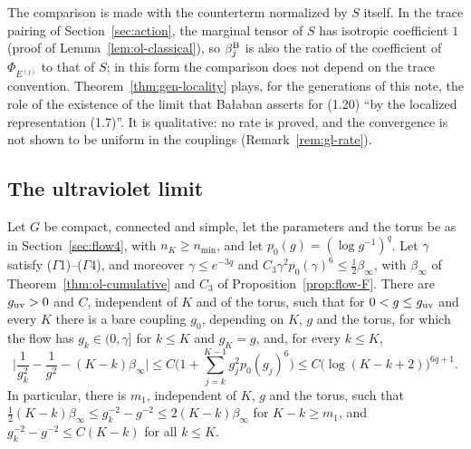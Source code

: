 The comparison is made with the counterterm normalized by $S$ itself. In the trace pairing of Section~\ref{sec:action}, the marginal tensor of $S$ has isotropic coefficient $1$ (proof of Lemma~\ref{lem:ol-classical}), so $\beta^{\rm B}_j$ is also the ratio of the coefficient of $\Phi_{E^{(j)}}$ to that of $S$; in this form the comparison does not depend on the trace convention. Theorem~\ref{thm:gen-locality} plays, for the generations of this note, the role of the existence of the limit that Ba\l aban asserts for (1.20) ``by the localized representation (1.7)''. It is qualitative: no rate is proved, and the convergence is not shown to be uniform in the couplings (Remark~\ref{rem:gl-rate}).

\subsection{The ultraviolet limit}\label{subsec:ol-uv-limit}

\begin{theorem}\label{thm:ol-uv}
Let $G$ be compact, connected and simple, let the parameters and the torus be as in Section~\ref{sec:flow4}, with $n_K\ge n_{\min}$, and let $p_0(g)=(\log g^{-1})^q$. Let $\gamma$ satisfy ($\Gamma$1)--($\Gamma$4), and moreover $\gamma\le e^{-3q}$ and $C_3\gamma^2p_0(\gamma)^6\le\frac12\beta_\infty$, with $\beta_\infty$ of Theorem~\ref{thm:ol-cumulative} and $C_3$ of Proposition~\ref{prop:flow-F}. There are $g_{\rm uv}>0$ and $C$, independent of $K$ and of the torus, such that for $0<g\le g_{\rm uv}$ and every $K$ there is a bare coupling $g_0$, depending on $K$, $g$ and the torus, for which the flow has $g_k\in(0,\gamma]$ for $k\le K$ and $g_K=g$, and, for every $k\le K$,
\[
\Big|\frac1{g_k^2}-\frac1{g^2}-(K-k)\beta_\infty\Big|\le C\Big(1+\sum_{j=k}^{K-1}g_j^2p_0(g_j)^6\Big)\le C\big(\log(K-k+2)\big)^{6q+1}.
\]
In particular, there is $m_1$, independent of $K$, $g$ and the torus, such that $\frac12(K-k)\beta_\infty\le g_k^{-2}-g^{-2}\le2(K-k)\beta_\infty$ for $K-k\ge m_1$, and $g_k^{-2}-g^{-2}\le C(K-k)$ for all $k\le K$.
\end{theorem}

